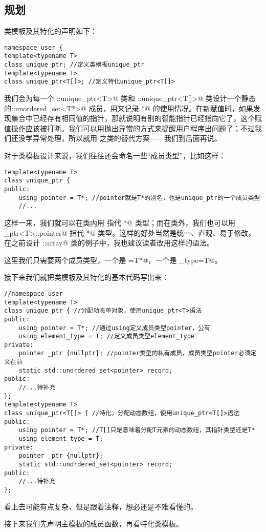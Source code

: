\subsection*{规划}
类模板及其特化的声明如下：
\begin{lstlisting}
namespace user {
template<typename T>
class unique_ptr; //定义类模板unique_ptr
template<typename T>
class unique_ptr<T[]>; //定义特化unique_ptr<T[]>
\end{lstlisting}\par
我们会为每一个 \lstinline@user::unique_ptr<T>@ 类和 \lstinline@user::unique_ptr<T[]>@ 类设计一个静态的\linebreak \lstinline@user::unordered_set<T*>@ 成员，用来记录 \lstinline@T*@ 的使用情况。在新赋值时，如果发现集合中已经存有相同值的指针，那就说明有别的智能指针已经指向它了，这个赋值操作应该被打断。我们可以用抛出异常的方式来提醒用户程序出问题了；不过我们还没学异常处理，所以就用 \lstinline@nullptr@ 之类的替代方案——我们到后面再说。\par
对于类模板设计来说，我们往往还会命名一些``成员类型''，比如这样：
\begin{lstlisting}
template<typename T>
class unique_ptr {
public:
    using pointer = T*; //pointer就是T*的别名，也是unique_ptr的一个成员类型
    //...
\end{lstlisting}
这样一来，我们就可以在类内用 \lstinline@pointer@ 指代 \lstinline@T*@ 类型；而在类外，我们也可以用\newline\lstinline@unique_ptr<T>::pointer@ 指代 \lstinline@T*@ 类型。这样的好处当然是统一、直观、易于修改。在之前设计 \lstinline@user::array@ 类的例子中，我也建议读者改用这样的语法。\par
这里我们只需要两个成员类型，一个是 \lstinline@pointer=T*@，一个是 \lstinline@element_type=T@。\par\pagebreak
接下来我们就把类模板及其特化的基本代码写出来：
\begin{lstlisting}
//namespace user
template<typename T>
class unique_ptr { //分配动态单对象，使用unique_ptr<T>语法
public:
    using pointer = T*; //通过using定义成员类型pointer，公有
    using element_type = T; //定义成员类型element_type
private:
    pointer _ptr {nullptr}; //pointer类型的私有成员，成员类型pointer必须定义在前
    static std::unordered_set<pointer> record;
public:
    //...待补充
};
template<typename T>
class unique_ptr<T[]> { //特化，分配动态数组，使用unique_ptr<T[]>语法
public:
    using pointer = T*; //T[]只是意味着分配T元素的动态数组，其指针类型还是T*
    using element_type = T;
private:
    pointer _ptr {nullptr};
    static std::unordered_set<pointer> record;
public:
    //...待补充
};
\end{lstlisting}
看上去可能有点复杂，但是跟着注释，想必还是不难看懂的。\par
接下来我们先声明主模板的成员函数，再看特化类模板。\par
